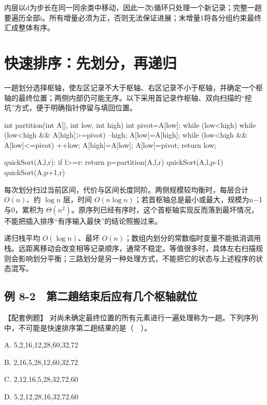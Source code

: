 内层以d为步长在同一同余类中移动，因此一次i循环只处理一个新记录；完整一趟要遍历全部i。所有增量必须为正，否则无法保证进展；末增量1将各分组约束最终汇成整体有序。

\section{快速排序：先划分，再递归}\label{DS08-06}

一趟划分选择枢轴，使左区记录不大于枢轴、右区记录不小于枢轴，并确定一个枢轴的最终位置；两侧内部仍可能无序。以下采用首记录作枢轴、双向扫描的``挖坑''方式，便于明确指针停留与填回位置。

\begin{codeblock}[language=C]
int partition(int A[], int low, int high) {
    int pivot=A[low];
    while (low<high) {
        while (low<high && A[high]>=pivot) --high;
        A[low]=A[high];
        while (low<high && A[low]<=pivot) ++low;
        A[high]=A[low];
    }
    A[low]=pivot;
    return low;
}
\end{codeblock}

\begin{codeblock}[language={}]
quickSort(A,l,r):
    if l>=r: return
    p=partition(A,l,r)
    quickSort(A,l,p-1)
    quickSort(A,p+1,r)
\end{codeblock}

每次划分扫过当前区间，代价与区间长度同阶。两侧规模较均衡时，每层合计 \(O(n)\)、约 \(\log n\) 层，时间 \(O(n\log n)\)；若首枢轴总是最小或最大，规模为n\ensuremath{-}1与0，累积为 \(\Theta(n^2)\)。原序列已经有序时，这个首枢轴实现反而落到最坏情况，不能把插入排序``有序输入最快''的结论照搬过来。

递归栈平均 \(O(\log n)\)、最坏 \(O(n)\)；数组内划分的常数临时变量不能抵消调用栈。远距离移动会改变相等记录顺序，通常不稳定。等值很多时，具体左右扫描规则会影响划分平衡；三路划分是另一种处理方式，不能把它的状态与上述程序的状态混写。

\subsection{例 8-2　第二趟结束后应有几个枢轴就位}\label{DS08-ex2}

\begin{example}[配套案例]

【配套例题】 对尚未确定最终位置的所有元素进行一遍处理称为一趟。下列序列中，不可能是快速排序第二趟结果的是（　）。

A. 5,2,16,12,28,60,32,72

B. 2,16,5,28,12,60,32,72

C. 2,12,16,5,28,32,72,60

D. 5,2,12,28,16,32,72,60

\end{example}

